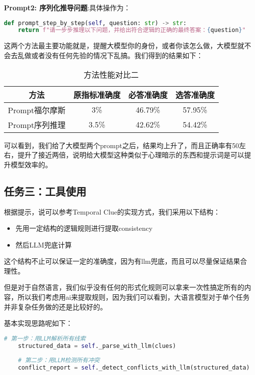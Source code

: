 \documentclass[answers]{exam}  %
\begin{document}
\textbf{Prompt2: 序列化推导问题}:具体操作为：
\begin{lstlisting}[language=python]
    def prompt_step_by_step(self, question: str) -> str:
    return f"请一步步推理以下问题，并给出符合逻辑的正确的最终答案：{question}"
\end{lstlisting}

这两个方法最主要功能就是，提醒大模型你的身份，或者你该怎么做，大模型就不会去乱做或者没有任何先验的情况下乱搞。我们得到的结果如下：

\begin{table}[h]
    \centering
    \begin{tabular}{cccc}
    \toprule
    \textbf{方法} & \textbf{原指标准确度} & \textbf{必答准确度} &\textbf{选答准确度}\\
    \midrule
    Prompt福尔摩斯 & 3\% & 46.79\% & 57.95\% \\
    \hline
    Prompt序列推理 & 3.5\% & 42.62\% & 54.42\% \\
    \bottomrule
    \end{tabular}
    \caption{方法性能对比二}
\end{table}

可以看到，我们给了大模型两个prompt之后，结果均上升了，而且正确率有50左右，提升了接近两倍，说明给大模型这种类似于心理暗示的东西和提示词是可以提升模型效率的。


\subsection{任务三：工具使用}

根据提示，说可以参考Temporal Clue的实现方式，我们采用以下结构：

\begin{itemize}
    \item 先用一定结构的逻辑规则进行提取consistency
    \item 然后LLM兜底计算
\end{itemize}

这个结构不止可以保证一定的准确度，因为有llm兜底，而且可以尽量保证结果合理性。

但是对于自然语言，我们似乎没有任何的形式化规则可以拿来一次性搞定所有的内容，所以我们考虑用ai来提取规则，因为我们可以看到，大语言模型对于单个任务并非复杂任务做的还是比较好的。

基本实现思路呢如下：

\begin{lstlisting}[language=python]
    # 第一步：用LLM解析所有线索
    structured_data = self._parse_with_llm(clues)
    
    # 第二步：用LLM检测所有冲突
    conflict_report = self._detect_conflicts_with_llm(structured_data)
\end{lstlisting}
\end{document}
